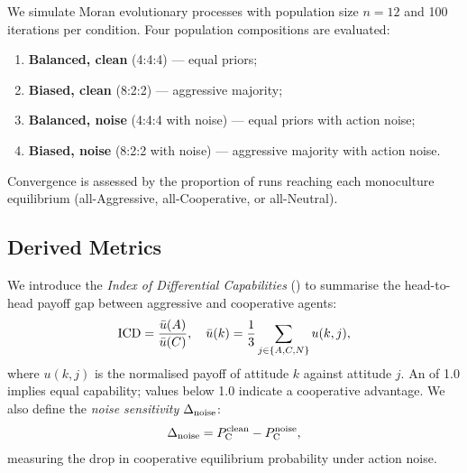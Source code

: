 We simulate Moran evolutionary processes with population size $n=12$ and 100
iterations per condition. Four population compositions are evaluated:
\begin{enumerate}
  \item \textbf{Balanced, clean} (4:4:4) --- equal priors;
  \item \textbf{Biased, clean} (8:2:2) --- aggressive majority;
  \item \textbf{Balanced, noise} (4:4:4 with noise) --- equal priors with action noise;
  \item \textbf{Biased, noise} (8:2:2 with noise) --- aggressive majority with action noise.
\end{enumerate}

Convergence is assessed by the proportion of runs reaching each monoculture
equilibrium (all-Aggressive, all-Cooperative, or all-Neutral).

\subsection{Derived Metrics}

We introduce the \emph{Index of Differential Capabilities} (\ICD) to summarise
the head-to-head payoff gap between aggressive and cooperative agents:
\begin{equation}
  \mathrm{ICD} = \frac{\bar{u}(A)}{\bar{u}(C)}, \quad
  \bar{u}(k) = \frac{1}{3}\sum_{j \in \{A,C,N\}} u(k,j),
  \label{eq:icd}
\end{equation}
where $u(k,j)$ is the normalised payoff of attitude $k$ against attitude $j$.
An \ICD of 1.0 implies equal capability; values below 1.0 indicate a cooperative
advantage. We also define the \emph{noise sensitivity} $\Delta_{\mathrm{noise}}$:
\begin{equation}
  \Delta_{\mathrm{noise}} = P_{\mathrm{C}}^{\text{clean}} - P_{\mathrm{C}}^{\text{noise}},
  \label{eq:dnoise}
\end{equation}
measuring the drop in cooperative equilibrium probability under action noise.
